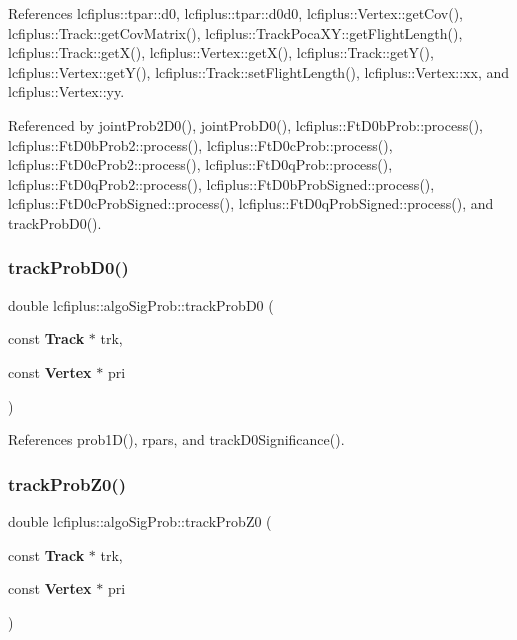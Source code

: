 References lcfiplus\+::tpar\+::d0, lcfiplus\+::tpar\+::d0d0, lcfiplus\+::\+Vertex\+::get\+Cov(), lcfiplus\+::\+Track\+::get\+Cov\+Matrix(), lcfiplus\+::\+Track\+Poca\+X\+Y\+::get\+Flight\+Length(), lcfiplus\+::\+Track\+::get\+X(), lcfiplus\+::\+Vertex\+::get\+X(), lcfiplus\+::\+Track\+::get\+Y(), lcfiplus\+::\+Vertex\+::get\+Y(), lcfiplus\+::\+Track\+::set\+Flight\+Length(), lcfiplus\+::\+Vertex\+::xx, and lcfiplus\+::\+Vertex\+::yy.



Referenced by joint\+Prob2\+D0(), joint\+Prob\+D0(), lcfiplus\+::\+Ft\+D0b\+Prob\+::process(), lcfiplus\+::\+Ft\+D0b\+Prob2\+::process(), lcfiplus\+::\+Ft\+D0c\+Prob\+::process(), lcfiplus\+::\+Ft\+D0c\+Prob2\+::process(), lcfiplus\+::\+Ft\+D0q\+Prob\+::process(), lcfiplus\+::\+Ft\+D0q\+Prob2\+::process(), lcfiplus\+::\+Ft\+D0b\+Prob\+Signed\+::process(), lcfiplus\+::\+Ft\+D0c\+Prob\+Signed\+::process(), lcfiplus\+::\+Ft\+D0q\+Prob\+Signed\+::process(), and track\+Prob\+D0().

\mbox{\label{namespacelcfiplus_1_1algoSigProb_ae83446908470b94aa993b3fab1b42b4d}} 
\subsubsection{track\+Prob\+D0()}
{\footnotesize\ttfamily double lcfiplus\+::algo\+Sig\+Prob\+::track\+Prob\+D0 (\begin{DoxyParamCaption}\item[{const \textbf{ Track} $\ast$}]{trk,  }\item[{const \textbf{ Vertex} $\ast$}]{pri }\end{DoxyParamCaption})}



References prob1\+D(), rpars, and track\+D0\+Significance().

\mbox{\label{namespacelcfiplus_1_1algoSigProb_a08c5b6f8a6acaf2823cb0b9aab62eb14}} 
\subsubsection{track\+Prob\+Z0()}
{\footnotesize\ttfamily double lcfiplus\+::algo\+Sig\+Prob\+::track\+Prob\+Z0 (\begin{DoxyParamCaption}\item[{const \textbf{ Track} $\ast$}]{trk,  }\item[{const \textbf{ Vertex} $\ast$}]{pri }\end{DoxyParamCaption})}



